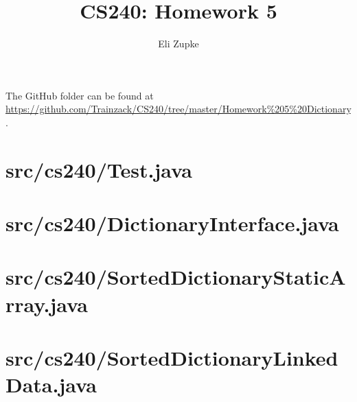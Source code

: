 \documentclass[letterpaper, 11pt]{article}
\title{CS240: Homework 5}
\author{Eli Zupke}
\newcommand{\inputcode}[1]{
	
	\needspace{5em}
	\section{#1}
	
	\vspace{5em}
	\pagebreak[3]
	
}
\begin{document}
\maketitle

The GitHub folder can be found at \url{https://github.com/Trainzack/CS240/tree/master/Homework%205%20Dictionary}.

\tableofcontents

\inputcode{src/cs240/Test.java}
\inputcode{src/cs240/DictionaryInterface.java}
\inputcode{src/cs240/SortedDictionaryStaticArray.java}
\inputcode{src/cs240/SortedDictionaryLinkedData.java}
\end{document}
